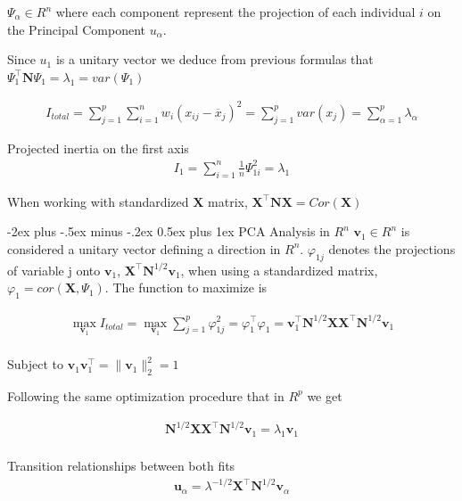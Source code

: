 \documentclass[10pt,landscape]{article}
\makeatletter
\renewcommand{\subsection}{\@startsection{subsection}{2}{0mm}%
                                {-2ex plus -.5ex minus -.2ex}%
                                {0.5ex plus 1ex}%
                                {\normalfont\normalsize\bfseries}}
\makeatother
\begin{document}
\begin{multicols*}{3}
$\Psi_{\alpha} \in R^n$ where each component represent the projection of each individual $i$ on the Principal Component $u_{\alpha}$.

Since $u_{1}$ is a unitary vector we deduce from previous formulas that  $\Psi_{1}^\intercal \mathbf{N} \Psi_{1} = \lambda_{1} = var(\Psi_1)$

\begin{align*}
I_{total}= \sum_{j=1}^{p} \sum_{i=1}^{n} w_i (x_{ij} - \overline{x}_j)^2 = \sum_{j=1}^{p} var(x_j) = \sum_{\alpha=1}^{p} \lambda_{\alpha}
\end{align*}

Projected inertia on the first axis
\begin{align*}
I_{1}= \sum_{i=1}^{n}\frac{1}{n}\Psi_{1 i}^2 = \lambda_1
\end{align*}

When working with  standardized $\mathbf{X}$ matrix, $\mathbf{X}^\intercal \mathbf{N} \mathbf{X} = Cor(\mathbf{X})$

\subsection{PCA Analysis in $R^{n}$}
$\mathbf{v}_1 \in R^{n}$ is considered a unitary vector defining a direction in $R^{n}$. $\varphi_{1j}$ denotes the projections of variable j onto $\mathbf{v}_1$, $\mathbf{X}^\intercal \mathbf{N}^{1/2} \mathbf{v}_1$, when using a standardized matrix, $\varphi_{1} = cor(\mathbf{X}, \Psi_{1})$. The function to maximize is

\begin{align*}
    \max_{\mathbf{v}_1} I_{total} = \max_{\mathbf{v}_1} \displaystyle\sum_{j=1}^{p} \varphi_{1j}^2 = \varphi_{1}^\intercal \varphi_{1} = \mathbf{v}_1^\intercal \mathbf{N}^{1/2} \mathbf{X} \mathbf{X}^\intercal \mathbf{N}^{1/2} \mathbf{v}_1 \\
    \end{align*}

Subject to $\mathbf{v}_1 \mathbf{v}_1^\intercal = \lVert \mathbf{v}_1  \rVert ^2_2 = 1$

Following the same optimization procedure that in $R^{p}$ we get

\begin{align*}
    \mathbf{N}^{1/2} \mathbf{X} \mathbf{X}^\intercal \mathbf{N}^{1/2} \mathbf{v}_1 = \lambda_{1} \mathbf{v}_1 \\
    \end{align*}
    
Transition relationships between both fits
\begin{align*}
    \mathbf{u}_{\alpha} = \lambda^{-1/2} \mathbf{X}^\intercal \mathbf{N}^{1/2} \mathbf{v}_\alpha
    \end{align*}


\end{multicols*}
\end{document}
